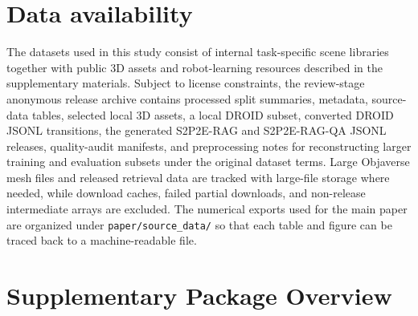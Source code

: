 \documentclass[12pt]{article}
\begin{document}
\section*{Data availability}

The datasets used in this study consist of internal task-specific scene libraries together with public 3D assets and robot-learning resources described in the supplementary materials. Subject to license constraints, the review-stage anonymous release archive contains processed split summaries, metadata, source-data tables, selected local 3D assets, a local DROID subset, converted DROID JSONL transitions, the generated S2P2E-RAG and S2P2E-RAG-QA JSONL releases, quality-audit manifests, and preprocessing notes for reconstructing larger training and evaluation subsets under the original dataset terms. Large Objaverse mesh files and released retrieval data are tracked with large-file storage where needed, while download caches, failed partial downloads, and non-release intermediate arrays are excluded. The numerical exports used for the main paper are organized under \texttt{paper/source\_data/} so that each table and figure can be traced back to a machine-readable file.

\section*{Supplementary Package Overview}
\end{document}
